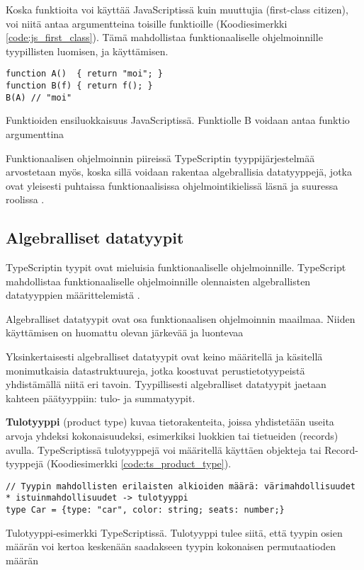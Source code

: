 Koska funktioita voi käyttää JavaScriptissä kuin muuttujia (first-class citizen), voi niitä antaa argumentteina toisille funktioille (Koodiesimerkki \ref{code:js_first_class}). Tämä mahdollistaa funktionaaliselle ohjelmoinnille tyypillisten  luomisen, ja käyttämisen.

\begin{code}
    \begin{verbatim}
function A()  { return "moi"; }
function B(f) { return f(); }
B(A) // "moi"
\end{verbatim}
    \caption{Funktioiden ensiluokkaisuus JavaScriptissä. Funktiolle B voidaan antaa funktio argumenttina}
    \label{code:js_first_class}
\end{code}

Funktionaalisen ohjelmoinnin piireissä TypeScriptin tyyppijärjestelmää arvostetaan myös, koska sillä voidaan rakentaa algebrallisia datatyyppejä, jotka ovat yleisesti puhtaissa funktionaalisissa ohjelmointikielissä läsnä ja suuressa roolissa \cite{holvikari2021category}.


\subsection{Algebralliset datatyypit}

TypeScriptin tyypit ovat mieluisia funktionaaliselle ohjelmoinnille. TypeScript mahdollistaa funktionaaliselle ohjelmoinnille olennaisten algebrallisten datatyyppien määrittelemistä \cite{holvikari2021category}.

Algebralliset datatyypit ovat osa funktionaalisen ohjelmoinnin maailmaa. Niiden käyttämisen on huomattu olevan järkevää ja luontevaa \cite{holvikari2021category,hickey_maybe_not,algebraic_data_types}

Yksinkertaisesti algebralliset datatyypit ovat keino määritellä ja käsitellä monimutkaisia datastruktuureja, jotka koostuvat perustietotyypeistä yhdistämällä niitä eri tavoin. Tyypillisesti algebralliset datatyypit jaetaan kahteen päätyyppiin: tulo- ja summatyypit.

\textbf{Tulotyyppi} (product type) kuvaa tietorakenteita, joissa yhdistetään useita arvoja yhdeksi kokonaisuudeksi, esimerkiksi luokkien tai tietueiden (records) avulla.
TypeScriptissä tulotyyppejä voi määritellä käyttäen objekteja tai Record-tyyppejä (Koodiesimerkki \ref{code:ts_product_type}). \citep{algebraic_data_types,holvikari2021category}

\begin{code}
    \begin{verbatim}
// Tyypin mahdollisten erilaisten alkioiden määrä: värimahdollisuudet * istuinmahdollisuudet -> tulotyyppi
type Car = {type: "car", color: string; seats: number;}
\end{verbatim}
    \caption{Tulotyyppi-esimerkki TypeScriptissä. Tulotyyppi tulee siitä, että tyypin osien määrän voi kertoa keskenään saadakseen tyypin kokonaisen permutaatioden määrän}
    \label{code:ts_product_type}
\end{code}

